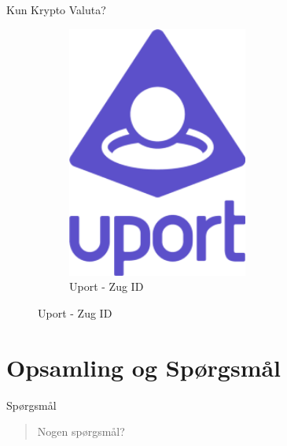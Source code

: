 \documentclass[12pt,t]{beamer}
\begin{document}
\begin{frame}{Kun Krypto Valuta?}
\begin{figure}
\begin{subfigure}[b]{0.45\textwidth}
		\centering
		\includegraphics[width=0.65\textwidth]{uport.png}
		\caption{Uport - Zug ID}
	\end{subfigure}
\end{figure}
\end{frame}

\section{Opsamling og Spørgsmål}
    \begin{frame}[c]{Spørgsmål}
        \begin{quote}
            \centering Nogen spørgsmål?
        \end{quote}
    \end{frame}
\end{document}
